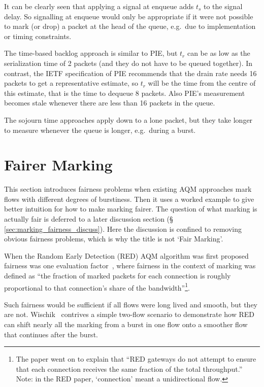 It can be clearly seen that applying a signal at enqueue adds \(t_s\) to the signal delay.
So signalling at enqueue would only be appropriate if it were not possible to mark (or drop) a packet at the head of the queue, e.g.\ due to implementation or timing constraints.

The time-based backlog approach is similar to PIE, but \(t_r\) can be as low as the serialization time of 2 packets (and they do not have to be queued together). In contrast, the IETF specification of PIE recommends that the drain rate needs 16 packets to get a representative estimate, so \(t_r\) will be the time from the centre of this estimate, that is the time to dequeue 8 packets. Also PIE's measurement becomes stale whenever there are less than 16 packets in the queue. 

The sojourn time approaches apply down to a lone packet, but they take longer to measure whenever the queue is longer, e.g.\ during a burst.

\section{Fairer Marking}\label{sec:fairer_marking}

This section introduces fairness problems when existing AQM approaches mark flows with different degrees of burstiness. Then it uses a worked example to give better intuition for how to make marking fairer. The question of what marking is actually fair is deferred to a later discussion section (\S\,\ref{sec:marking_fairness_discuss}). Here the discussion is confined to removing obvious fairness problems, which is why the title is not `Fair Marking'.

When the Random Early Detection (RED) AQM algorithm was first proposed fairness was one evaluation factor~\cite[\S\,8]{Floyd93:RED}, where fairness in the context of marking was defined as ``the fraction of marked packets for each connection is roughly proportional to that connection’s share of the bandwidth''\footnote{The paper went on to explain that ``RED gateways do not attempt to ensure that each connection receives the same fraction of the total throughput.'' Note: in the RED paper, `connection' meant a unidirectional flow.}.

Such fairness would be sufficient if all flows were long lived and smooth, but they are not.  Wischik~\cite{Wischik99:Mark_Fairly} contrives a simple two-flow scenario to demonstrate how RED can shift nearly all the marking from a burst in one flow onto a smoother flow that continues after the burst. %

